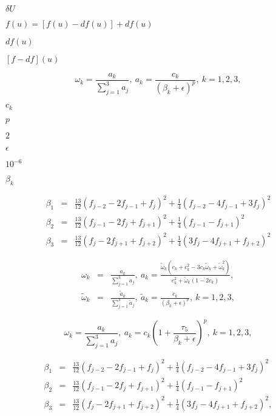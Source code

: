 \documentclass{article}
\begin{document}
$\delta U$
\pagebreak

$f\left(u\right) = \left[f\left(u\right)-df\left(u\right)\right] + df\left(u\right)$
\pagebreak

$df\left(u\right)$
\pagebreak

$\left[f-df\right]\left(u\right)$
\pagebreak

\begin{equation} \omega_k = \frac {a_k} {\sum_{j=1}^3 a_j },\ a_k = \frac {c_k} {\left(\beta_k+\epsilon\right)^p},\ k = 1,2,3, \end{equation}
\pagebreak

$c_k$
\pagebreak

$p$
\pagebreak

$2$
\pagebreak

$\epsilon$
\pagebreak

$10^{-6}$
\pagebreak

$\beta_k$
\pagebreak

\begin{eqnarray} \beta_1 &=& \frac{13}{12} \left(f_{j-2}-2f_{j-1}+f_j\right)^2 + \frac{1}{4}\left(f_{j-2}-4f_{j-1}+3f_j\right)^2 \\ \beta_2 &=& \frac{13}{12} \left(f_{j-1}-2f_j+f_{j+1}\right)^2 + \frac{1}{4}\left(f_{j-1}-f_{j+1}\right)^2 \\ \beta_3 &=& \frac{13}{12} \left(f_j-2f_{j+1}+f_{j+2}\right)^2 + \frac{1}{4}\left(3f_j-4f_{j+1}+f_{j+2}\right)^2 \end{eqnarray}
\pagebreak

\begin{eqnarray} \omega_k &=& \frac {a_k} {\sum_{j=1}^3 a_j },\ a_k = \frac {\tilde{\omega}_k \left( c_k + c_k^2 - 3c_k\tilde{\omega}_k + \tilde{\omega}_k^2\right)} {c_k^2 + \tilde{\omega}_k\left(1-2c_k\right)}, \\ \tilde{\omega}_k &=& \frac {\tilde{a}_k} {\sum_{j=1}^3 \tilde{a}_j },\ \tilde{a}_k = \frac {c_k} {\left(\beta_k+\epsilon\right)^p},\ k = 1,2,3, \end{eqnarray}
\pagebreak

\begin{equation} \omega_k = \frac {a_k} {\sum_{j=1}^3 a_j },\ a_k = c_k \left( 1 + \frac{\tau_5}{\beta_k+\epsilon} \right)^p,\ k = 1,2,3, \end{equation}
\pagebreak

\begin{eqnarray} \beta_1 &=& \frac{13}{12} \left(f_{j-2}-2f_{j-1}+f_j\right)^2 + \frac{1}{4}\left(f_{j-2}-4f_{j-1}+3f_j\right)^2 \\ \beta_2 &=& \frac{13}{12} \left(f_{j-1}-2f_j+f_{j+1}\right)^2 + \frac{1}{4}\left(f_{j-1}-f_{j+1}\right)^2 \\ \beta_3 &=& \frac{13}{12} \left(f_j-2f_{j+1}+f_{j+2}\right)^2 + \frac{1}{4}\left(3f_j-4f_{j+1}+f_{j+2}\right)^2, \end{eqnarray}
\pagebreak
\end{document}
